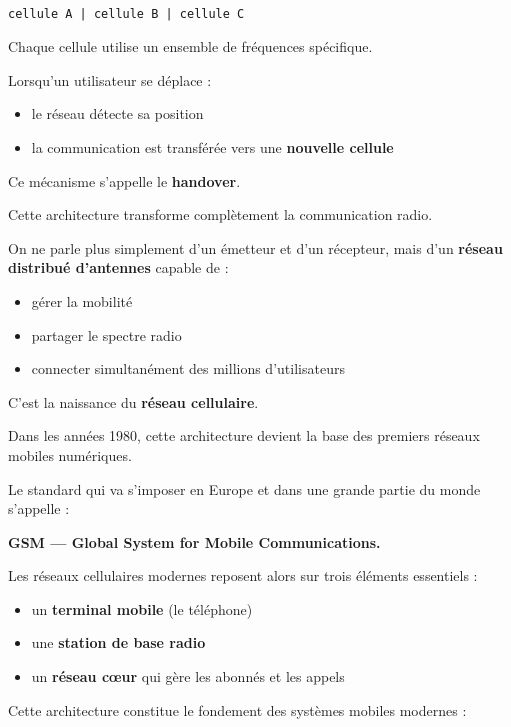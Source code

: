 \documentclass[
  french,
]{article}
\providecommand{\tightlist}{%
  \setlength{\itemsep}{0pt}\setlength{\parskip}{0pt}}
\begin{document}
\begin{verbatim}

cellule A | cellule B | cellule C
\end{verbatim}

Chaque cellule utilise un ensemble de fréquences spécifique.

Lorsqu'un utilisateur se déplace :

\begin{itemize}
\tightlist
\item
  le réseau détecte sa position
\item
  la communication est transférée vers une \textbf{nouvelle cellule}
\end{itemize}

Ce mécanisme s'appelle le \textbf{handover}.

Cette architecture transforme complètement la communication radio.

On ne parle plus simplement d'un émetteur et d'un récepteur, mais d'un
\textbf{réseau distribué d'antennes} capable de :

\begin{itemize}
\tightlist
\item
  gérer la mobilité
\item
  partager le spectre radio
\item
  connecter simultanément des millions d'utilisateurs
\end{itemize}

C'est la naissance du \textbf{réseau cellulaire}.

Dans les années 1980, cette architecture devient la base des premiers
réseaux mobiles numériques.

Le standard qui va s'imposer en Europe et dans une grande partie du
monde s'appelle :

\textbf{GSM --- Global System for Mobile Communications.}

Les réseaux cellulaires modernes reposent alors sur trois éléments
essentiels :

\begin{itemize}
\tightlist
\item
  un \textbf{terminal mobile} (le téléphone)
\item
  une \textbf{station de base radio}
\item
  un \textbf{réseau cœur} qui gère les abonnés et les appels
\end{itemize}

Cette architecture constitue le fondement des systèmes mobiles modernes
:
\end{document}
